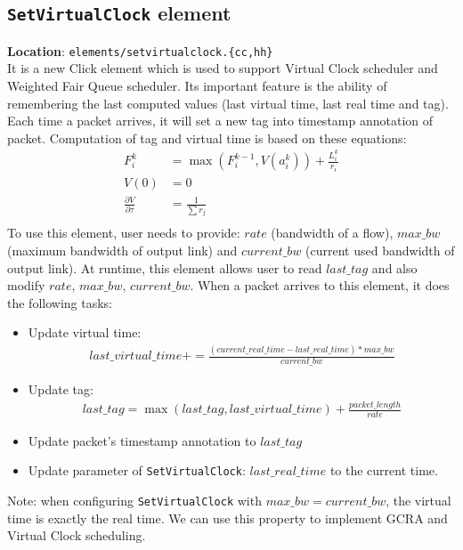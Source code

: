 \documentclass[a4paper]{article}
\begin{document}
  \subsection{\texttt{SetVirtualClock} element} \label{section:virtualclock}
  \textbf{Location}: \texttt{elements/setvirtualclock.\{cc,hh\}}\\
  It is a new Click element which is used to support Virtual Clock scheduler and Weighted Fair Queue scheduler. Its important feature is the ability of remembering the last computed values (last virtual time, last real time and tag). Each time a packet arrives, it will set a new tag into timestamp annotation of packet. Computation of tag and virtual time is based on these equations: \\ 
  \begin{align*}
  F_{i}^{k} &= \max(F_{i}^{k-1}, V(a_{i}^{k})) + \frac{L_{i}^{k}}{r_i}\\
  V(0) &= 0 \\
  \frac{\partial V}{\partial \tau} &= \frac{1}{\sum r_j} \\
  \end{align*}
  To use this element, user needs to provide: $rate$ (bandwidth of a flow), $max\_bw$ (maximum bandwidth of output link) and $current\_bw$ (current used bandwidth of output link). At runtime, this element allows user to read $last\_tag$ and also modify $rate$, $max\_bw$, $current\_bw$. When a packet arrives to this element, it does the following tasks:
  \begin{itemize}
  	\item Update virtual time: 
  	\begin{align*}last\_virtual\_time += \frac{(current\_real\_time - last\_real\_time)*max\_bw}{current\_bw}\end{align*}
  	\item Update tag:
  	\begin{align*}last\_tag = \max(last\_tag, last\_virtual\_time) + \frac{packet\_length}{rate}\end{align*}
  	\item Update packet's timestamp annotation to $last\_tag$
  	\item Update parameter of \texttt{SetVirtualClock}: $last\_real\_time$ to the current time.  	
  \end{itemize}
  Note: when configuring \texttt{SetVirtualClock} with $max\_bw = current\_bw$, the virtual time is exactly the real time. We can use this property to implement GCRA and Virtual Clock scheduling.
\end{document}
